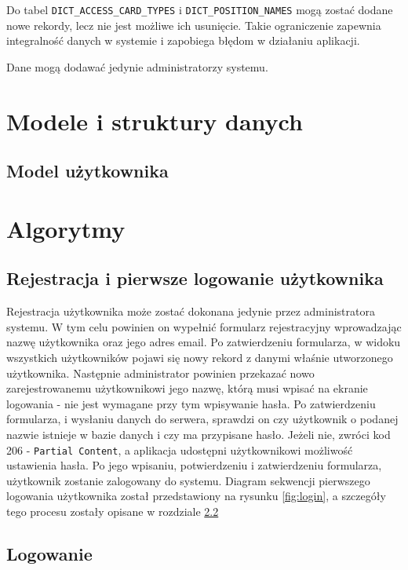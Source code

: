 Do tabel \texttt{DICT\_ACCESS\_CARD\_TYPES} i \texttt{DICT\_POSITION\_NAMES} mogą zostać dodane nowe rekordy, lecz nie jest możliwe ich usunięcie. Takie ograniczenie zapewnia integralność danych w systemie i zapobiega błędom w działaniu aplikacji.

Dane mogą dodawać jedynie administratorzy systemu.

\section{Modele i struktury danych}


\subsection{Model użytkownika}

\section{Algorytmy}

\subsection{Rejestracja i pierwsze logowanie użytkownika}

Rejestracja użytkownika może zostać dokonana jedynie przez administratora systemu. W tym celu powinien on wypełnić formularz rejestracyjny wprowadzając nazwę użytkownika oraz jego adres email. Po zatwierdzeniu formularza, w widoku wszystkich użytkowników pojawi się nowy rekord z danymi właśnie utworzonego użytkownika. Następnie administrator powinien przekazać nowo zarejestrowanemu użytkownikowi jego nazwę, którą musi wpisać na ekranie logowania - nie jest wymagane przy tym wpisywanie hasła. Po zatwierdzeniu formularza, i wysłaniu danych do serwera, sprawdzi on czy użytkownik o podanej nazwie istnieje w bazie danych i czy ma przypisane hasło. Jeżeli nie, zwróci kod 206 - \texttt{Partial Content}, a aplikacja udostępni użytkownikowi możliwość ustawienia hasła. Po jego wpisaniu, potwierdzeniu i zatwierdzeniu formularza, użytkownik zostanie zalogowany do systemu. Diagram sekwencji pierwszego logowania użytkownika został przedstawiony na rysunku \ref{fig:login}, a szczegóły tego procesu zostały opisane w rozdziale \ref{ss:logowanie}

\subsection{Logowanie}
\label{ss:logowanie}

